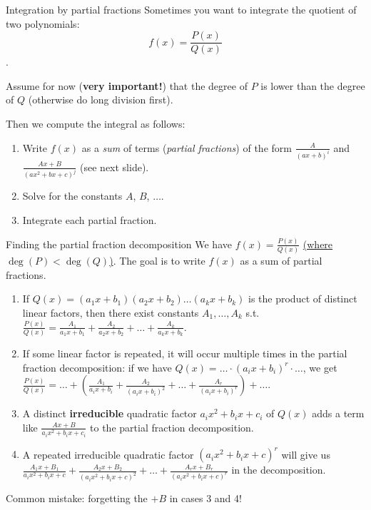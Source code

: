 \begin{frame}{Integration by partial fractions}
    Sometimes you want to integrate the quotient of two polynomials: \[f(x)=\frac{P(x)}{Q(x)}\].

    \pause
    Assume for now (\textbf{very important!}) that the degree of $P$ is lower than the degree of $Q$ (otherwise do long division first).

    \pause
    Then we compute the integral as follows:
    \begin{enumerate}
        \item Write $f(x)$ as a \emph{sum} of terms (\emph{partial fractions}) of the form $\frac{A}{(ax+b)^i}$ and $\frac{Ax+B}{(ax^2+bx+c)^j}$ (see next slide).
        \pause\item Solve for the constants $A$, $B$, $\dots$.
        \pause\item Integrate each partial fraction.
    \end{enumerate}
\end{frame}

\begin{frame}{Finding the partial fraction decomposition}
    We have $f(x)=\frac{P(x)}{Q(x)}$ \underline{(where $\mathop{\text{deg}}(P)<\mathop{\text{deg}}(Q)$)}. The goal is to write $f(x)$ as a sum of partial fractions.

    \begin{enumerate}
        \pause\item If $Q(x)=(a_1x+b_1)(a_2x+b_2)\dots(a_kx+b_k)$ is the product of distinct linear factors, then there exist constants $A_1,\dots,A_k$ s.t. $\frac{P(x)}{Q(x)}=\frac{A_1}{a_1x+b_1}+\frac{A_2}{a_2x+b_2}+\dots+\frac{A_k}{a_kx+b_k}$.
        \pause\item If some linear factor is repeated, it will occur multiple times in the partial fraction decomposition: if we have $Q(x)=\hdots\cdot(a_ix+b_i)^r\cdot\dots$, we get $\frac{P(x)}{Q(x)}=\hdots+\left(\frac{A_1}{a_ix+b_i}+\frac{A_2}{(a_ix+b_i)^2}+\dots+\frac{A_r}{(a_ix+b_i)^r}\right)+\dots$.
        \pause\item A distinct \textbf{irreducible} quadratic factor $a_ix^2+b_ix+c_i$ of $Q(x)$ adds a term like $\frac{Ax+B}{a_ix^2+b_ix+c_i}$ to the partial fraction decomposition.
        \pause\item A repeated irreducible quadratic factor $(a_ix^2+b_ix+c)^r$ will give us $\frac{A_1x+B_1}{a_ix^2+b_ix+c}+\frac{A_2x+B_2}{(a_ix^2+b_ix+c)^2}+\dots+\frac{A_rx+B_r}{(a_ix^2+b_ix+c)^r}$ in the decomposition.
    \end{enumerate}
    \pause Common mistake: forgetting the $+B$ in cases 3 and 4!
\end{frame}

